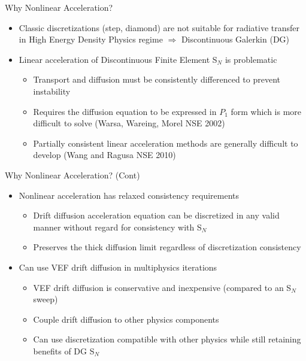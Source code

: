 \documentclass[10pt]{beamer}
\newcommand{\SN}{S$_N$\xspace}
\begin{document}
\begin{frame}{Why Nonlinear Acceleration?}

	\begin{itemize}

		\item Classic discretizations (step, diamond) are not suitable for radiative transfer in High Energy Density Physics regime $\Rightarrow$ Discontinuous Galerkin (DG) 

		\item Linear acceleration of Discontinuous Finite Element \SN is problematic 
		\begin{itemize}
			\item Transport and diffusion must be consistently differenced to prevent instability 

			\item Requires the diffusion equation to be expressed in $P_1$ form which is more difficult to solve (Warsa, Wareing, Morel NSE 2002) 

			\item Partially consistent linear acceleration methods are generally difficult to develop (Wang and Ragusa NSE 2010)

		\end{itemize}

	\end{itemize}

\end{frame}

\begin{frame}{Why Nonlinear Acceleration? (Cont)}

	\begin{itemize}

		\item Nonlinear acceleration has relaxed consistency requirements 
		\begin{itemize}
			\item Drift diffusion acceleration equation can be discretized in any valid manner without regard for consistency with \SN  

			\item Preserves the thick diffusion limit regardless of discretization consistency 
		\end{itemize}

		\item Can use VEF drift diffusion in multiphysics iterations 
		\begin{itemize}

			\item VEF drift diffusion is conservative and inexpensive (compared to an \SN sweep) 

			\item Couple drift diffusion to other physics components 

			\item Can use discretization compatible with other physics while still retaining benefits of DG \SN 

		\end{itemize}

	\end{itemize}

\end{frame}
\end{document}
